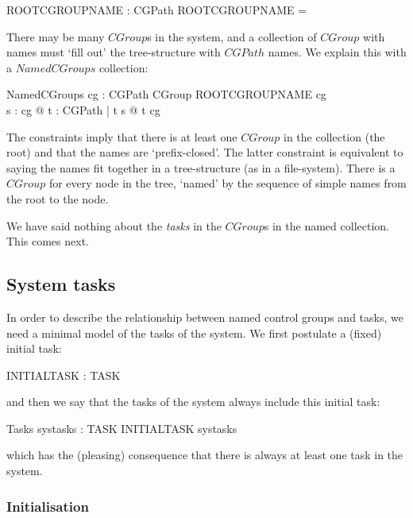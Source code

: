 \documentclass[a4paper,twoside,12pt]{article}
\begin{document}
\begin{axdef}{}
ROOTCGROUPNAME : CGPath
\where
ROOTCGROUPNAME = \langle \rangle
\end{axdef}

There may be many $CGroup$s in the system, and a collection of $CGroup$ with names must `fill out' the tree-structure with $CGPath$ names. We explain this with a $NamedCGroups$ collection:

\begin{schema}{NamedCGroups}
cg : CGPath \ffun CGroup
\where
ROOTCGROUPNAME \in \dom cg \\
\forall s : \dom cg @ \forall t : CGPath | t \subset s @ t \in \dom cg
\end{schema}
The constraints imply that there is  at least one $CGroup$ in the collection (the root) and that the names are `prefix-closed'. The latter constraint is equivalent to saying the names fit together in a tree-structure (as in a file-system). 
There is a $CGroup$ for every node in the tree, `named' by the sequence of simple names from the root to the node.

We have said nothing about the \emph{tasks} in the $CGroup$s in the named collection.
This comes next.

\subsection{System tasks}
In order to describe the relationship between named control groups and tasks, we need a minimal model of the tasks of the system. We first postulate a (fixed) initial task:

\begin{axdef}{}
INITIALTASK : TASK
\end{axdef}
and then we say that the tasks of the system always include this initial task:

\begin{schema}{Tasks}
systasks : \finset TASK
\where
INITIALTASK \in systasks
\end{schema}
which has the (pleasing) consequence that there is always at least one task in the system.

\subsubsection{Initialisation}
\end{document}
